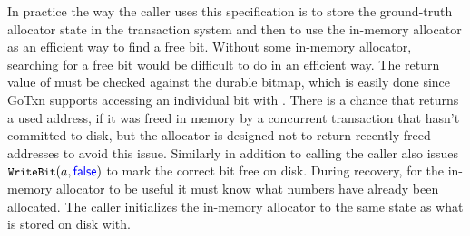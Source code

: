 In practice the way the caller uses this specification is to store the
ground-truth allocator state in the transaction system and then to use the
in-memory allocator as an efficient way to find a free bit. Without some in-memory
allocator, searching for a free bit would be difficult to do in an efficient
way. The return value of  must be checked against the durable bitmap,
which is easily done since GoTxn supports accessing an individual bit with
. There is a chance that  returns a used address, if it was
freed in memory by a concurrent transaction that hasn't committed to disk, but the allocator
is designed not to return recently freed addresses to avoid this issue.
Similarly in addition to calling  the caller also issues
$\cc{WriteBit}(a, \goosefalse)$ to mark the correct bit free on disk. During
recovery, for the in-memory allocator to be useful it must know what numbers
have already been allocated. The caller initializes the in-memory allocator to
the same state as what is stored on disk with.
